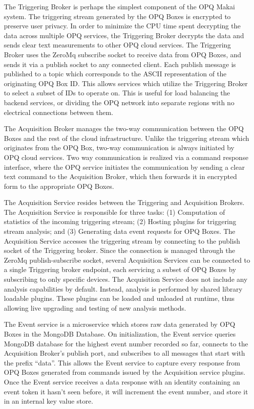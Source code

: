 The Triggering Broker is perhaps the simplest component of the OPQ Makai system. The triggering stream generated by the OPQ Boxes is encrypted to preserve user privacy. In order to minimize the CPU time spent decrypting the data across multiple OPQ services, the Triggering Broker decrypts the data and sends clear text measurements to other OPQ cloud services. The Triggering Broker uses the ZeroMq subscribe socket to receive data from OPQ Boxes, and sends it via a publish socket to any connected client. Each publish message is published to a topic which corresponds to the ASCII representation of the originating OPQ Box ID. This allows services which utilize the Triggering Broker to select a subset of IDs to operate on. This is useful for load balancing the backend services, or dividing the OPQ network into separate regions with no electrical connections between them.

The Acquisition Broker manages the two-way communication between the OPQ Boxes and the rest of the cloud infrastructure. Unlike the triggering stream which originates from the OPQ Box, two-way communication is always initiated by OPQ cloud services. Two way communication is realized via a command response interface, where the OPQ service initiates the communication by sending a clear text command to the Acquisition Broker, which then forwards it in encrypted form to the appropriate OPQ Boxes.

The Acquisition Service resides between the Triggering and Acquisition Brokers. The Acquisition Service is responsible for three tasks:
(1) Computation of statistics of the incoming triggering stream; (2) Hosting plugins for triggering stream analysis; and (3) Generating data event requests for OPQ Boxes. The Acquisition Service accesses the triggering stream by connecting to the publish socket of the Triggering broker. Since the connection is managed through the ZeroMq publish-subscribe socket, several Acquisition Services can be connected to a single Triggering broker endpoint, each servicing a subset of OPQ Boxes by subscribing to only specific devices. The Acquisition Service does not include any analysis capabilities by default. Instead, analysis is performed by shared library loadable plugins. These plugins can be loaded and unloaded at runtime, thus allowing live upgrading and testing of new analysis methods.

The Event service is a microservice which stores raw data generated by OPQ Boxes in the MongoDB Database. On initialization, the Event service queries MongoDB database for the highest event number recorded so far, connects to the Acquisition Broker’s publish port, and subscribes to all messages that start with the prefix ``data”. This allows the Event service to capture every response from OPQ Boxes generated from commands issued by the Acquisition service plugins. Once the Event service receives a data response with an identity containing an event token it hasn’t seen before, it will increment the event number, and store it in an internal key value store.


